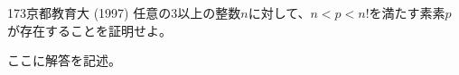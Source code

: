 \begin{thm}{173}{}{京都教育大 (1997)}
 任意の3以上の整数$n$に対して、$n<p<n!$を満たす素素$p$が存在することを証明せよ。
\end{thm}

ここに解答を記述。